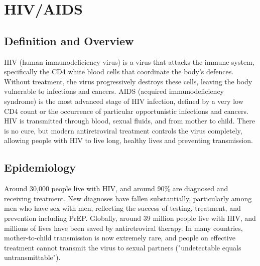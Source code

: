\chapter{HIV/AIDS}

\section*{Definition and Overview}
HIV (human immunodeficiency virus) is a virus that attacks the immune system, specifically the CD4 white blood cells that coordinate the body's defences. Without treatment, the virus progressively destroys these cells, leaving the body vulnerable to infections and cancers. AIDS (acquired immunodeficiency syndrome) is the most advanced stage of HIV infection, defined by a very low CD4 count or the occurrence of particular opportunistic infections and cancers. HIV is transmitted through blood, sexual fluids, and from mother to child. There is no cure, but modern antiretroviral treatment controls the virus completely, allowing people with HIV to live long, healthy lives and preventing transmission.

\section*{Epidemiology}
Around 30,000 people live with HIV, and around 90\% are diagnosed and receiving treatment. New diagnoses have fallen substantially, particularly among men who have sex with men, reflecting the success of testing, treatment, and prevention including PrEP. Globally, around 39 million people live with HIV, and millions of lives have been saved by antiretroviral therapy. In many countries, mother-to-child transmission is now extremely rare, and people on effective treatment cannot transmit the virus to sexual partners ("undetectable equals untransmittable").

